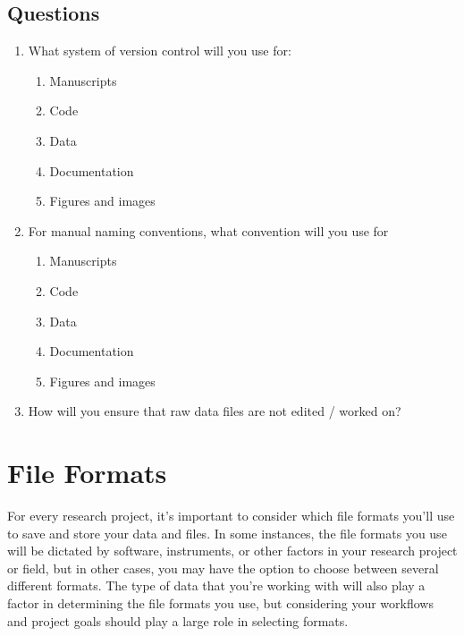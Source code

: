 \documentclass[
]{book}
\providecommand{\tightlist}{%
  \setlength{\itemsep}{0pt}\setlength{\parskip}{0pt}}
\begin{document}
\hypertarget{questions-3}{%
\section*{Questions}\label{questions-3}}

\begin{enumerate}
\def\labelenumi{\arabic{enumi}.}
\tightlist
\item
  What system of version control will you use for:

  \begin{enumerate}
  \def\labelenumii{\alph{enumii}.}
  \tightlist
  \item
    Manuscripts
  \item
    Code
  \item
    Data
  \item
    Documentation
  \item
    Figures and images
  \end{enumerate}
\item
  For manual naming conventions, what convention will you use for

  \begin{enumerate}
  \def\labelenumii{\alph{enumii}.}
  \tightlist
  \item
    Manuscripts
  \item
    Code
  \item
    Data
  \item
    Documentation
  \item
    Figures and images
  \end{enumerate}
\item
  How will you ensure that raw data files are not edited / worked on?
\end{enumerate}

\hypertarget{file-formats-1}{%
\chapter*{File Formats}\label{file-formats-1}}

For every research project, it's important to consider which file formats you'll use to save and store your data and files. In some instances, the file formats you use will be dictated by software, instruments, or other factors in your research project or field, but in other cases, you may have the option to choose between several different formats. The type of data that you're working with will also play a factor in determining the file formats you use, but considering your workflows and project goals should play a large role in selecting formats.
\end{document}
